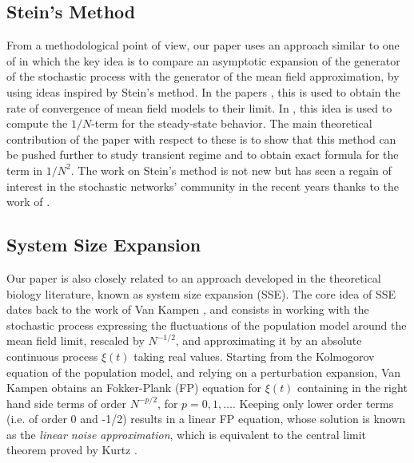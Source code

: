 \documentclass[sigconf]{acmart}
\begin{document}
\subsection{Stein's Method}

From a methodological point of view, our paper uses an approach
similar to one of
\cite{gast2017expected,gast2017refined,kolokoltsov2011mean,ying2016rate,ying2017stein}
in which the key idea is to compare an asymptotic expansion of the
generator of the stochastic process with the generator of the mean
field approximation, by using ideas inspired by Stein's method.  In
the papers
\cite{gast2017expected,kolokoltsov2011mean,ying2016rate,ying2017stein},
this is used to obtain the rate of convergence of mean field models to
their limit. In \cite{gast2017refined}, this idea is used to compute
the $1/N$-term for the steady-state behavior. The main theoretical
contribution of the paper with respect to these is to show that this
method can be pushed further to study transient regime and to obtain
exact formula for the term in $1/N^2$.  The work on Stein's method is
not new \cite{stein1986approximate} but has seen a regain of interest
in the stochastic networks' community in the recent years thanks to
the work of \cite{braverman2017stein,braverman2017stein2}.

\subsection{System Size Expansion}
\label{sec:SSE}
Our paper is also closely related to an approach developed in the theoretical biology literature, known as system size expansion (SSE). The core idea of SSE dates back to the work of Van Kampen \cite{vankampen2007}, and consists in working with the stochastic process expressing the fluctuations of the population model around the mean field limit, rescaled by $N^{-1/2}$, and approximating it by an absolute continuous process $\xi(t)$ taking real values. Starting from the Kolmogorov equation of the population model, and relying on a perturbation expansion, Van Kampen obtains an Fokker-Plank (FP) equation for $\xi(t)$ containing in the right hand side terms of  order $N^{-p/2}$, for $p=0,1,\ldots$. Keeping only lower order terms (i.e. of order 0 and -1/2) results in a linear FP equation, whose solution is known as the \emph{linear noise approximation}, which is equivalent to the central limit theorem proved by Kurtz \cite{kurtz_book}. 
\end{document}
